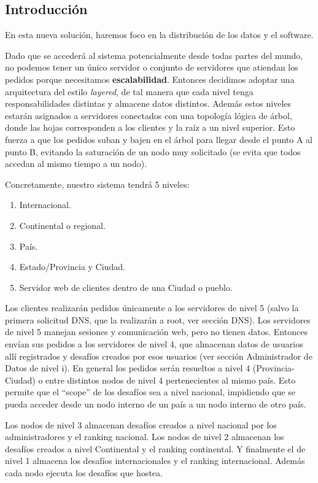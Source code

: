 \subsection{Introducción}

En esta nueva solución, haremos foco en la distribución de los datos y el software.

Dado que se accederá al sistema potencialmente desde todas partes del mundo, no podemos tener un único servidor o conjunto de servidores que atiendan los pedidos porque necesitamos {\bf escalabilidad}. Entonces decidimos adoptar una arquitectura del estilo \emph{layered}, de tal manera que cada nivel tenga responsabilidades distintas y almacene datos distintos. Además estos niveles estarán asignados a servidores conectados con una topología lógica de árbol, donde las hojas corresponden a los clientes y la raíz a un nivel superior. Esto fuerza a que los pedidos suban y bajen en el árbol para llegar desde el punto A al punto B, evitando la saturación de un nodo muy solicitado (se evita que todos accedan al mismo tiempo a un nodo).

Concretamente, nuestro sistema tendrá 5 niveles:
\begin{enumerate}
	\item Internacional.
	\item Continental o regional.
	\item País.
	\item Estado/Provincia y Ciudad.
	\item Servidor web de clientes dentro de una Ciudad o pueblo.
\end{enumerate}

Los clientes realizarán pedidos únicamente a los servidores de nivel 5 (salvo la primera solicitud DNS, que la realizarán a root, ver sección DNS). Los servidores de nivel 5 manejan sesiones y comunicación web, pero no tienen datos. Entonces envían sus pedidos a los servidores de nivel 4, que almacenan datos de usuarios allí registrados y desafíos creados por esos usuarios (ver sección Administrador de Datos de nivel i). En general los pedidos serán resueltos a nivel 4 (Provincia-Ciudad) o entre distintos nodos de nivel 4 pertenecientes al mismo país. Esto permite que el ``scope'' de los desafíos sea a nivel nacional, impidiendo que se pueda acceder desde un nodo interno de un país a un nodo interno de otro país.

Los nodos de nivel 3 almacenan desafíos creados a nivel nacional por los administradores y el ranking nacional. Los nodos de nivel 2 almacenan los desafíos creados a nivel Continental y el ranking continental. Y finalmente el de nivel 1 almacena los desafíos internacionales y el ranking internacional. Además cada nodo ejecuta los desafíos que hostea.

